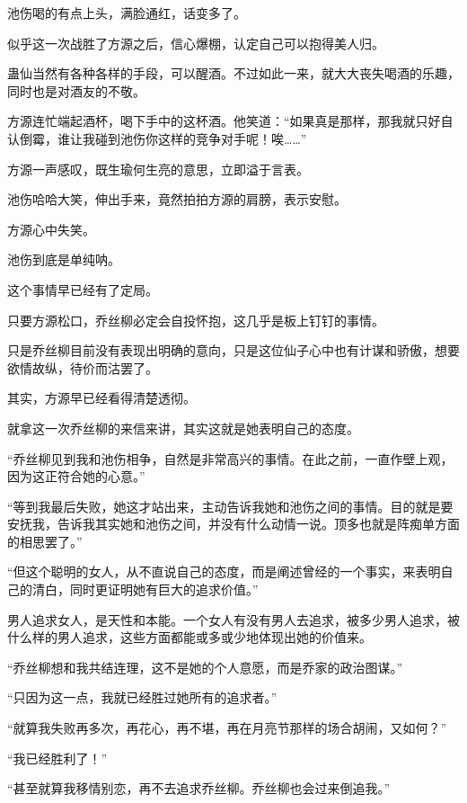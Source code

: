
\begin{this_body}



池伤喝的有点上头，满脸通红，话变多了。

似乎这一次战胜了方源之后，信心爆棚，认定自己可以抱得美人归。

蛊仙当然有各种各样的手段，可以醒酒。不过如此一来，就大大丧失喝酒的乐趣，同时也是对酒友的不敬。

方源连忙端起酒杯，喝下手中的这杯酒。他笑道：“如果真是那样，那我就只好自认倒霉，谁让我碰到池伤你这样的竞争对手呢！唉……”

方源一声感叹，既生瑜何生亮的意思，立即溢于言表。

池伤哈哈大笑，伸出手来，竟然拍拍方源的肩膀，表示安慰。

方源心中失笑。

池伤到底是单纯呐。

这个事情早已经有了定局。

只要方源松口，乔丝柳必定会自投怀抱，这几乎是板上钉钉的事情。

只是乔丝柳目前没有表现出明确的意向，只是这位仙子心中也有计谋和骄傲，想要欲情故纵，待价而沽罢了。

其实，方源早已经看得清楚透彻。

就拿这一次乔丝柳的来信来讲，其实这就是她表明自己的态度。

“乔丝柳见到我和池伤相争，自然是非常高兴的事情。在此之前，一直作壁上观，因为这正符合她的心意。”

“等到我最后失败，她这才站出来，主动告诉我她和池伤之间的事情。目的就是要安抚我，告诉我其实她和池伤之间，并没有什么动情一说。顶多也就是阵痴单方面的相思罢了。”

“但这个聪明的女人，从不直说自己的态度，而是阐述曾经的一个事实，来表明自己的清白，同时更证明她有巨大的追求价值。”

男人追求女人，是天性和本能。一个女人有没有男人去追求，被多少男人追求，被什么样的男人追求，这些方面都能或多或少地体现出她的价值来。

“乔丝柳想和我共结连理，这不是她的个人意愿，而是乔家的政治图谋。”

“只因为这一点，我就已经胜过她所有的追求者。”

“就算我失败再多次，再花心，再不堪，再在月亮节那样的场合胡闹，又如何？”

“我已经胜利了！”

“甚至就算我移情别恋，再不去追求乔丝柳。乔丝柳也会过来倒追我。”


\end{this_body}

